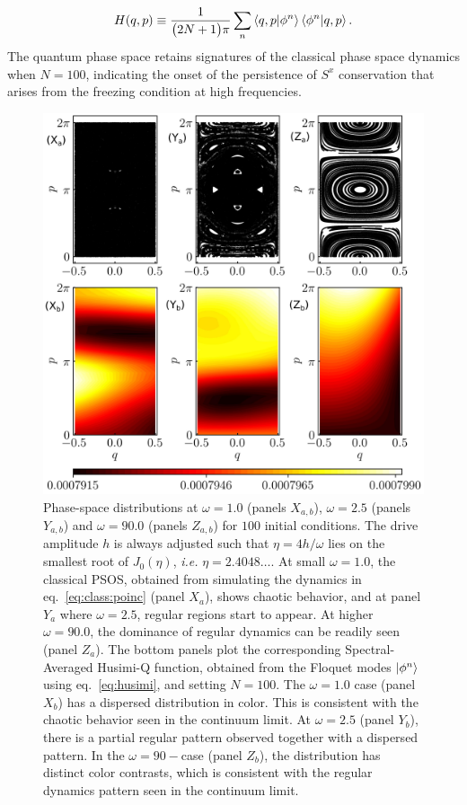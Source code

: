 \documentclass[%
reprint,
superscriptaddress,
amsmath,amssymb,
aps,
prb,
showkeys,
]{revtex4-2}
\begin{document}
\begin{equation}
	H(q,p)\equiv \frac{1}{\big(2N+1\big)\pi}\sum_n \ip{q,p}{\phi^n}\ip{\phi^n}{q,p}.
	\label{eq:husimi}
\end{equation}
The quantum phase space retains signatures of the classical phase space dynamics when $N=100$, indicating the onset of the persistence of $S^x$ conservation that arises from the freezing condition at high frequencies. 
\begin{figure}[t!]
	\centering
	\includegraphics[width = 9.0 cm]{figure_8.jpeg}
	\caption{Phase-space distributions at $\omega=1.0$ (panels $X_{a,b}$), $\omega=2.5$ (panels $Y_{a,b}$) and $\omega=90.0$ (panels $Z_{a,b}$) for $100$ initial conditions. The drive amplitude $h$ is always adjusted such that $\eta=4h/\omega$ lies on the smallest root of $J_0(\eta)$, \textit{i.e.} $\eta=2.4048\dots$. At small $\omega=1.0$, the classical PSOS, obtained from simulating the dynamics in eq.~\ref{eq:class:poinc} (panel $X_{a}$),  shows chaotic behavior, and at panel $Y_{a}$ where $\omega = 2.5$, regular regions start to appear. At higher $\omega = 90.0$, the dominance of regular dynamics can be readily seen (panel $Z_{a}$). The bottom panels plot the corresponding Spectral-Averaged Husimi-Q function, obtained from the Floquet modes $\ket{\phi^n}$ using eq.~\ref{eq:husimi}, and setting $N=100$. The $\omega=1.0$ case (panel $X_{b}$) has a dispersed distribution in color. This is consistent with the chaotic behavior seen in the continuum limit. At $\omega = 2.5$ (panel $Y_{b}$), there is a partial regular pattern observed together with a dispersed pattern. In the $\omega=90-$case (panel $Z_{b}$), the distribution has distinct color contrasts, which is consistent with the regular dynamics pattern seen in the continuum limit.}
	\label{fig:classical_lipkin}
\end{figure}
\end{document}
